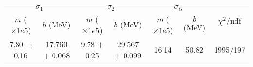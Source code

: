 \begin{tabular}{cc|cc|cc||c}
\multicolumn{2}{c|}{$\sigma_1$} & \multicolumn{2}{|c}{$\sigma_2$} & \multicolumn{2}{|c}{$\sigma_G$}  & \multirow{2}{*}{$\chi^2/$ndf}\\
$m$ ($\times1e5$) & $b$ (MeV) & $m$ ($\times1e5$) & $b$ (MeV) & $m$ ($\times1e5$) & $b$ (MeV) & \\
\hline
7.80 $\pm$ 0.16 & 17.760 $\pm$ 0.068 & 9.78 $\pm$ 0.25 & 29.567 $\pm$ 0.099 & 16.14 & 50.82 & 1995/197\\
\end{tabular}
